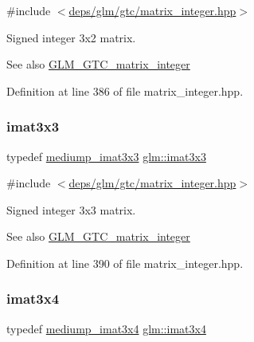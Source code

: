 {\ttfamily \#include $<$\hyperlink{matrix__integer_8hpp}{deps/glm/gtc/matrix\+\_\+integer.\+hpp}$>$}

Signed integer 3x2 matrix. \begin{DoxySeeAlso}{See also}
\hyperlink{group__gtc__matrix__integer}{G\+L\+M\+\_\+\+G\+T\+C\+\_\+matrix\+\_\+integer} 
\end{DoxySeeAlso}


Definition at line 386 of file matrix\+\_\+integer.\+hpp.

\mbox{\label{group__gtc__matrix__integer_gaeff9ef8f56cccc828d6b897923e75402}} 
\subsubsection{\texorpdfstring{imat3x3}{imat3x3}}
{\footnotesize\ttfamily typedef \hyperlink{group__gtc__matrix__integer_ga1304a2da9c3f5937aa8c4684d638d09c}{mediump\+\_\+imat3x3} \hyperlink{group__gtc__matrix__integer_gaeff9ef8f56cccc828d6b897923e75402}{glm\+::imat3x3}}



{\ttfamily \#include $<$\hyperlink{matrix__integer_8hpp}{deps/glm/gtc/matrix\+\_\+integer.\+hpp}$>$}

Signed integer 3x3 matrix. \begin{DoxySeeAlso}{See also}
\hyperlink{group__gtc__matrix__integer}{G\+L\+M\+\_\+\+G\+T\+C\+\_\+matrix\+\_\+integer} 
\end{DoxySeeAlso}


Definition at line 390 of file matrix\+\_\+integer.\+hpp.

\mbox{\label{group__gtc__matrix__integer_gaee5507e6cbbdd05841a0c174e60dd036}} 
\subsubsection{\texorpdfstring{imat3x4}{imat3x4}}
{\footnotesize\ttfamily typedef \hyperlink{group__gtc__matrix__integer_gae0ab87609ac842f31be9e581caafa0f0}{mediump\+\_\+imat3x4} \hyperlink{group__gtc__matrix__integer_gaee5507e6cbbdd05841a0c174e60dd036}{glm\+::imat3x4}}



